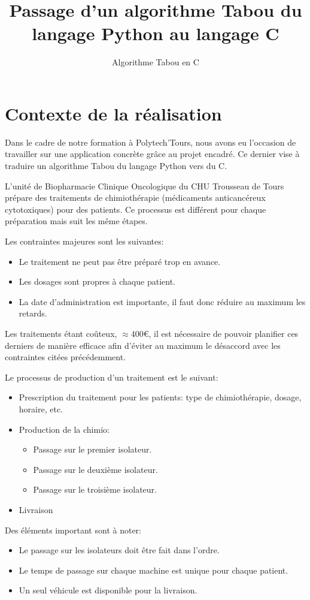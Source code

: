 \documentclass[hideweeklyreports]{polytech/polytech}
\title{Passage d'un algorithme Tabou du langage Python au langage C}
\subtitle{Algorithme Tabou en C}
\begin{document}
	\chapter{Contexte de la réalisation}
		Dans le cadre de notre formation à Polytech'Tours, nous avons eu l'occasion de travailler sur une application concrète grâce au projet encadré. Ce dernier vise à traduire un algorithme Tabou du langage Python vers du C.
		
		L'unité de Biopharmacie Clinique Oncologique du CHU Trousseau de Tours prépare des traitements de chimiothérapie (médicaments anticancéreux cytotoxiques) pour des patients. Ce processus est différent pour chaque préparation mais suit les même étapes.
		
		Les contraintes majeures sont les suivantes:
		\begin{itemize}
			\item Le traitement ne peut pas être préparé trop en avance.
			\item Les dosages sont propres à chaque patient.
			\item La date d'administration est importante, il faut donc réduire au maximum les retards.
		\end{itemize}
		
		Les traitements étant coûteux, $\approx 400$€, il est nécessaire de pouvoir planifier ces derniers de manière efficace afin d'éviter au maximum le désaccord avec les contraintes citées précédemment.
		
		Le processus de production d'un traitement est le suivant:
		\begin{itemize}
			\item Prescription du traitement pour les patients: type de chimiothérapie, dosage, horaire, etc.
			\item Production de la chimio:
				\begin{itemize}
					\item Passage sur le premier isolateur.
					\item Passage sur le deuxième isolateur.
					\item Passage sur le troisième isolateur.
				\end{itemize}
			\item Livraison
		\end{itemize}
		
		Des éléments important sont à noter:
		\begin{itemize}
			\item Le passage sur les isolateurs doit être fait dans l'ordre.
			\item Le temps de passage sur chaque machine est unique pour chaque patient.
			\item Un seul véhicule est disponible pour la livraison.
		\end{itemize}
		
\end{document}
